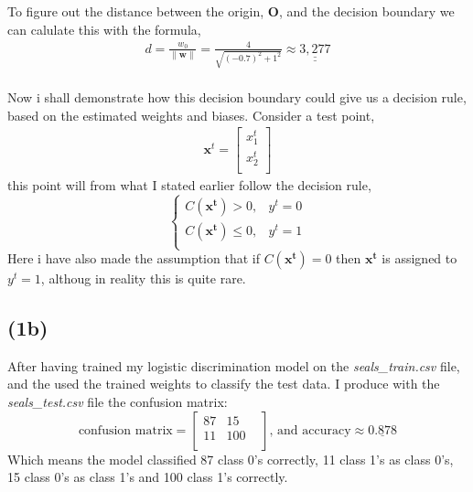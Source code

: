 \documentclass[12pt, letterpaper]{article}
\newcommand{\bs}{\boldsymbol}
\newcommand{\mbf}{\mathbf}
\begin{document}
      \newline
      To figure out the distance between the origin, $\bs{O}$, and the decision boundary we can calulate this with the formula,
      \begin{align*}
        d = \frac{w_0}{\|\bs{w}\|} = \frac{4}{\sqrt{(-0.7)^2 + 1^2}} \approx \underline{\underline{3,277}}
      \end{align*}\\
      Now i shall demonstrate how this decision boundary could give us a decision rule, based on the estimated weights and biases. Consider a test point,
      \begin{align*}
        \mbf{x}^t =
        \begin{bmatrix}
          x_1^t \\
          x_2^t \\
        \end{bmatrix}
      \end{align*}
      this point will from what I stated earlier follow the  decision rule,
      \[
        \begin{cases}
          C(\mbf{x^t}) > 0, & y^t = 0\\
          C(\mbf{x^t}) \leq 0, & y^t = 1\\
        \end{cases}
      \]
      Here i have also made the assumption that if  $C(\mbf{x^t}) = 0$ then $\mbf{x^t}$ is assigned to $y^t = 1$, althoug in reality this is quite rare.

    \subsection*{(1b)}
      After having trained my logistic discrimination model on the \textit{seals\_train.csv} file, and the used the trained weights to classify the test data. I produce with the \textit{seals\_test.csv} file the confusion matrix:\\
      \[
        \text{confusion matrix} =
        \begin{bmatrix}
          87 & 15  & \\
          11 & 100 & \\
        \end{bmatrix}
        \text{, and accuracy} \approx \underline{0.878}
      \]
      Which means the model classified 87 class 0's correctly, 11 class 1's as class 0's, 15 class 0's as class 1's and 100 class 1's correctly.
    \newpage
\end{document}
